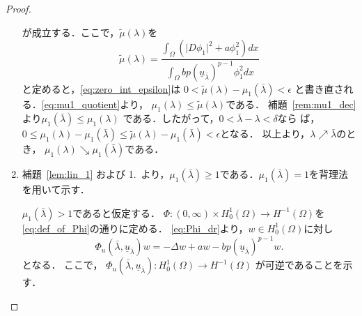 \begin{proof}
\begin{enumerate}[1.]
        が成立する．ここで，$\tilde{\mu}(\lambda)$を
        \[
         \tilde{\mu}(\lambda) = 
        \frac{\displaystyle \int_\Omega \left( \lvert D\phi_1
                                              \rvert^2
                                              + a
                                             \phi_1^2\right) dx}
         {\displaystyle 
         \int_\Omega bp (\underline{u}_{\bar{\lambda}})^{p-1} \phi_1^2 dx}
        \]
        と定めると，\eqref{eq:zero_int_epsilon}は
        $0 < \tilde{\mu}(\lambda) - \mu_1(\bar{\lambda}) < \epsilon$
        と書き直される．\eqref{eq:mu1_quotient}より，
        $\mu_1(\lambda) \leq \tilde{\mu}(\lambda)$である．
        補題~\ref{rem:mu1_dec}より$\mu_1(\bar{\lambda}) \leq
        \mu_1(\lambda)$
        である．したがって，$0 < \bar{\lambda} - \lambda < \delta$なら
        ば，$0 \leq \mu_1 (\lambda) - \mu_1 (\bar{\lambda}) \leq
        \tilde{\mu}(\lambda) - \mu_1 (\bar{\lambda}) < \epsilon$となる．
        以上より，$\lambda \nearrow \bar{\lambda}$のとき，
        $\mu_1(\lambda) \searrow \mu_1(\bar{\lambda})$である．
  \item 補題~\ref{lem:lin_1} および 1.~より，$\mu_1(\bar{\lambda})
        \geq 1$である．$\mu_1(\bar{\lambda}) = 1$を背理法を用いて示す．
        
        $\mu_1(\bar{\lambda}) > 1$であると仮定する．
        $\Phi \colon (0,\infty) \times H^1_0 (\Omega) \to
        H^{-1}(\Omega)$を
        \eqref{eq:def_of_Phi}の通りに定める．
        \eqref{eq:Phi_dr}より，$w \in H^1_0(\Omega)$に対し
        \begin{equation}
         \Phi_u (\bar{\lambda}, \underline{u}_{\bar{\lambda}})
          w = -\Delta w + aw - b
          p(\underline{u}_{\bar{\lambda}})^{p-1} w.
          \label{eq:Phi_dr_barlambda}
        \end{equation}
        となる．
        ここで，
        $\Phi_u (\bar{\lambda}, \underline{u}_{\bar{\lambda}}) \colon
        H_0^1(\Omega) \to H^{-1}(\Omega)$
        が可逆であることを示す．


\end{enumerate}
\end{proof}
